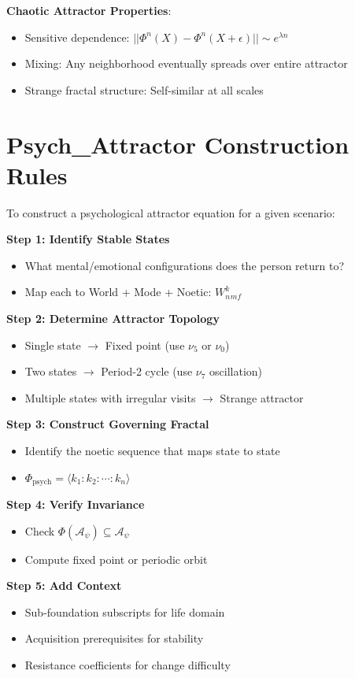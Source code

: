 \documentclass[11pt,twoside]{book}
\newcommand{\noe}[1]{\nu_{#1}}
\newcommand{\Frac}{\Phi}
\newcommand{\PsychAttractor}{\mathcal{A}_\psi}
\begin{document}
\textbf{Chaotic Attractor Properties}:
\begin{itemize}
    \item Sensitive dependence: $||\Frac^n(X) - \Frac^n(X + \epsilon)|| \sim e^{\lambda n}$
    \item Mixing: Any neighborhood eventually spreads over entire attractor
    \item Strange fractal structure: Self-similar at all scales
\end{itemize}

\section{Psych\_Attractor Construction Rules}

\begin{tcolorbox}[colback=yellow!5!white,colframe=yellow!75!black,title=\textbf{Construction Algorithm},breakable]
To construct a psychological attractor equation for a given scenario:

\textbf{Step 1: Identify Stable States}
\begin{itemize}
    \item What mental/emotional configurations does the person return to?
    \item Map each to World + Mode + Noetic: $W_n^k_{mf}$
\end{itemize}

\textbf{Step 2: Determine Attractor Topology}
\begin{itemize}
    \item Single state $\to$ Fixed point (use $\noe{5}$ or $\noe{0}$)
    \item Two states $\to$ Period-2 cycle (use $\noe{7}$ oscillation)
    \item Multiple states with irregular visits $\to$ Strange attractor
\end{itemize}

\textbf{Step 3: Construct Governing Fractal}
\begin{itemize}
    \item Identify the noetic sequence that maps state to state
    \item $\Frac_{\mathrm{psych}} = \langle k_1 : k_2 : \cdots : k_n \rangle$
\end{itemize}

\textbf{Step 4: Verify Invariance}
\begin{itemize}
    \item Check $\Frac(\PsychAttractor) \subseteq \PsychAttractor$
    \item Compute fixed point or periodic orbit
\end{itemize}

\textbf{Step 5: Add Context}
\begin{itemize}
    \item Sub-foundation subscripts for life domain
    \item Acquisition prerequisites for stability
    \item Resistance coefficients for change difficulty
\end{itemize}
\end{tcolorbox}
\end{document}
